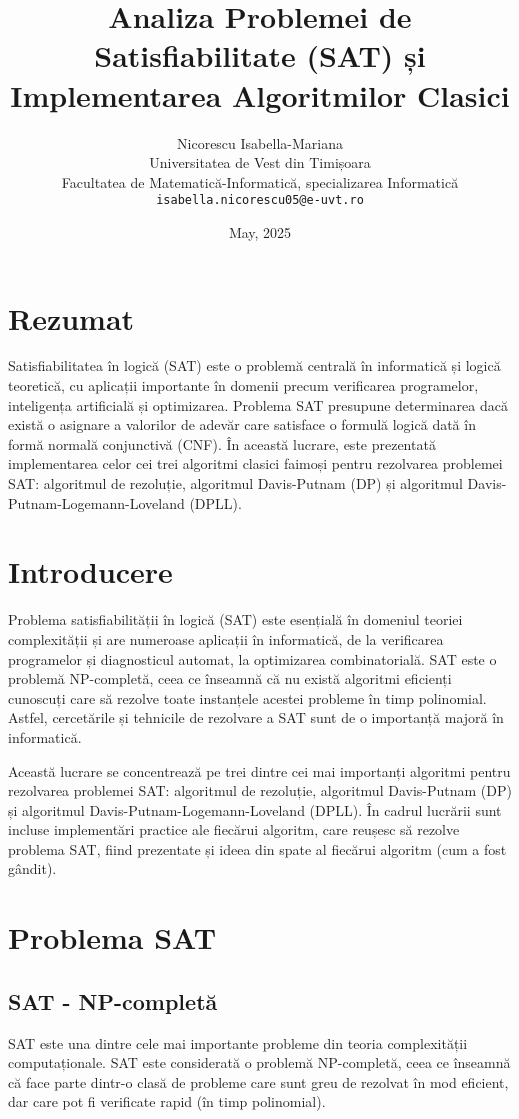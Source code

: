 \documentclass[12pt,a4paper]{article}
\title{\textbf{Analiza Problemei de Satisfiabilitate (SAT) și Implementarea Algoritmilor Clasici}}
\author{Nicorescu Isabella-Mariana\\Universitatea de Vest din Timișoara\\Facultatea de Matematică-Informatică, specializarea Informatică\\\texttt{isabella.nicorescu05@e-uvt.ro}}
\date{May, 2025}
\begin{document}
\maketitle
\newpage
\tableofcontents
{}


\newpage

\section{Rezumat}
Satisfiabilitatea în logică (SAT) este o problemă centrală în informatică și logică teoretică, cu aplicații importante în domenii precum verificarea programelor, inteligența artificială și optimizarea. Problema SAT presupune determinarea dacă există o asignare a valorilor de adevăr care satisface o formulă logică dată în formă normală conjunctivă (CNF). În această lucrare, este prezentată implementarea celor cei trei algoritmi clasici faimoși pentru rezolvarea problemei SAT: algoritmul de rezoluție, algoritmul Davis-Putnam (DP) și algoritmul Davis-Putnam-Logemann-Loveland (DPLL).

\section{Introducere}
Problema satisfiabilității în logică (SAT) este esențială în domeniul teoriei complexității și are numeroase aplicații în informatică, de la verificarea programelor și diagnosticul automat, la optimizarea combinatorială. SAT este o problemă NP-completă, ceea ce înseamnă că nu există algoritmi eficienți cunoscuți care să rezolve toate instanțele acestei probleme în timp polinomial. Astfel, cercetările și tehnicile de rezolvare a SAT sunt de o importanță majoră în informatică.

 Această lucrare se concentrează pe trei dintre cei mai importanți algoritmi pentru rezolvarea problemei SAT: algoritmul de rezoluție, algoritmul Davis-Putnam (DP) și algoritmul Davis-Putnam-Logemann-Loveland (DPLL). În cadrul lucrării sunt incluse implementări practice ale fiecărui algoritm, care reușesc să rezolve problema SAT, fiind prezentate și ideea din spate al fiecărui algoritm (cum a fost gândit).


\section{Problema SAT}
\subsection{SAT - NP-completă}
SAT este una dintre cele mai importante probleme din teoria complexității computaționale. SAT este considerată o problemă NP-completă, ceea ce înseamnă că face parte dintr-o clasă de probleme care sunt greu de rezolvat în mod eficient, dar care pot fi verificate rapid (în timp polinomial).
\end{document}
